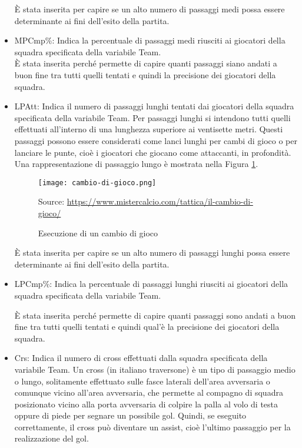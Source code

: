 \begin{itemize}
	È stata inserita per capire se un alto numero di passaggi medi possa essere determinante ai fini dell'esito della partita. 

	\item \textsf{MPCmp\%}: Indica la percentuale di passaggi medi riusciti ai giocatori della squadra specificata della variabile \textsf{Team}.\\ 
	
	È stata inserita perché permette di capire quanti passaggi siano andati a buon fine tra tutti quelli tentati e quindi la precisione dei giocatori della squadra.
	\item \textsf{LPAtt}: Indica il numero di passaggi lunghi tentati dai giocatori della squadra specificata della variabile \textsf{Team}. Per passaggi lunghi si intendono tutti quelli effettuati all'interno di una lunghezza superiore ai ventisette metri. Questi passaggi possono essere considerati come lanci lunghi per cambi di gioco o per lanciare le punte, cioè i giocatori che giocano come attaccanti, in profondità. Una rappresentazione di passaggio lungo è mostrata nella Figura \ref{fig:cambio}.
	\begin{figure}[ht]
		\begin{center}
			\texttt{[image: cambio-di-gioco.png]}
			\caption{Esecuzione di un cambio di gioco} \label{fig:cambio}
			Source: \url{https://www.mistercalcio.com/tattica/il-cambio-di-gioco/}
		\end{center}
	\end{figure}
	
	È stata inserita per capire se un alto numero di passaggi lunghi possa essere determinante ai fini dell'esito della partita.

	\item \textsf{LPCmp\%}: Indica la percentuale di passaggi lunghi riusciti ai giocatori della squadra specificata della variabile \textsf{Team}. 
	
	È stata inserita perché permette di capire quanti passaggi sono andati a buon fine tra tutti quelli tentati e quindi qual'è la precisione dei giocatori della squadra.
	
	\item \textsf{Crs}: Indica il numero di cross effettuati dalla squadra specificata della variabile \textsf{Team}. Un cross (in italiano traversone) è un tipo di passaggio medio o lungo, solitamente effettuato sulle fasce laterali dell'area avversaria o comunque vicino all'area avversaria, che permette al compagno di squadra posizionato vicino alla porta avversaria di colpire la palla al volo di testa oppure di piede per segnare un possibile gol. Quindi, se eseguito correttamente, il cross può diventare un assist, cioè l'ultimo passaggio per la realizzazione del gol. 
	

\end{itemize}
